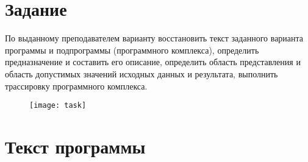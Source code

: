 
\tableofcontents

\newpage

\section{Задание}
По выданному преподавателем варианту восстановить текст заданного варианта программы и подпрограммы (программного комплекса), определить предназначение и составить его описание, определить область представления и область допустимых значений исходных данных и результата, выполнить трассировку программного комплекса.

\begin{figure}[H]
\centering
\texttt{[image: task]}
\label{pic:task}
\end{figure}


\section{Текст программы}
